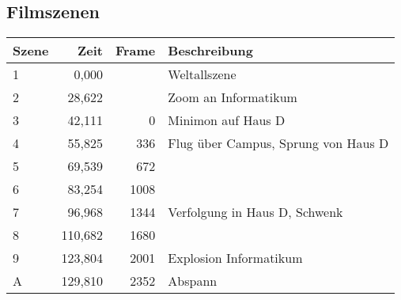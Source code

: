 \subsection{Filmszenen}

\begin{tabular}{p{1cm}rrp{9cm}}
	\textbf{Szene} & \textbf{Zeit} & \textbf{Frame} & \textbf{Beschreibung} \\
	\hline
	1 & 0,000 & & Weltallszene\\
	2 & 28,622 & & Zoom an Informatikum\\
	3 & 42,111 & 0 & Minimon auf Haus D\\
	4 & 55,825 & 336 & Flug über Campus, Sprung von Haus D\\
	5 & 69,539 & 672 & \\
	6 & 83,254 & 1008 & \\
	7 & 96,968 & 1344 & Verfolgung in Haus D, Schwenk\\
	8 & 110,682 & 1680 & \\
	9 & 123,804 & 2001 & Explosion Informatikum\\
	A & 129,810 & 2352 & Abspann\\
\end{tabular}